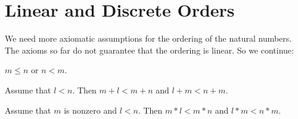 \documentclass{stex}
\begin{document}
\section{Linear and Discrete Orders}

We need more axiomatic assumptions for the ordering of the natural numbers. The axioms
so far do not guarantee that the ordering is linear.
So we continue:

\begin{forthel}

\begin{axiom} $m \leq n$ or $n < m$.
\end{axiom}

\begin{lemma} Assume that $l < n$.
  Then $m + l < m + n$ and $l + m < n + m$.
\end{lemma}

\begin{lemma} Assume that $m$ is nonzero and $l < n$.
  Then $m * l < m * n$ and $l * m < n * m$.
\end{lemma}

\end{forthel}
\end{document}
